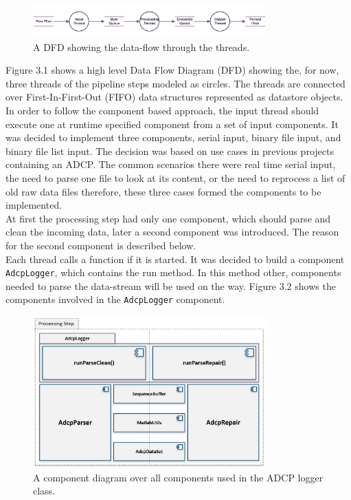 \begin{figure}[h]
\centering
      \includegraphics[width=0.8\textwidth]{dfd}
        \caption{A DFD showing the data-flow through the threads.}
\end{figure}
Figure 3.1 shows a high level Data Flow Diagram (DFD) showing the, for now, three threads of the pipeline steps modeled as circles. The threads are connected over First-In-First-Out (FIFO) data structures represented as datastore objects. In order to follow the component based approach, the input thread should execute one at runtime specified component from a set of input components. It was decided to implement three components, serial input, binary file input, and binary file list input. The decision was based on use cases in previous projects containing an ADCP. The common scenarios there were real time serial input, the need to parse one file to look at its content, or the need to reprocess a list of old raw data files therefore, these three cases formed the components to be implemented.\\ 
At first the processing step had only one component, which should parse and clean the incoming data, later a second component was introduced. The reason for the second component is described below.\\
Each thread calls a function if it is started. It was decided to build a component \texttt{AdcpLogger}, which contains the run method. In this method other, components needed to parse the data-stream will be used on the way. Figure 3.2 shows the components involved in the \texttt{AdcpLogger} component. 
\begin{figure}[h]
\centering
      \includegraphics[width=0.8\textwidth]{components}
        \caption{A component diagram over all components used in the ADCP logger class.} 
\end{figure}
